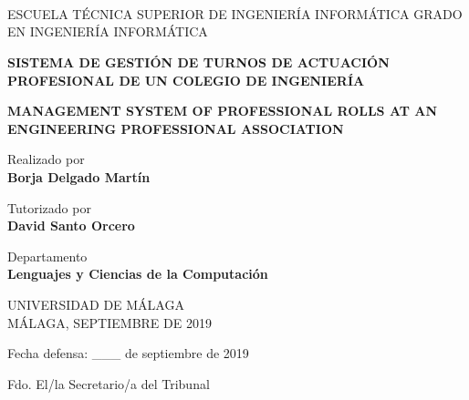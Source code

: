 \thispagestyle{empty}\newpage~

\newpage~\thispagestyle{empty}

\newpage~\thispagestyle{empty} 
\begin{center}
	{\fontsize{13.9}{14}\selectfont ESCUELA TÉCNICA SUPERIOR DE INGENIERÍA INFORMÁTICA GRADO EN INGENIERÍA INFORMÁTICA} \par \vspace{60pt}

	\textbf{{\fontsize{18}{18}\selectfont SISTEMA DE GESTIÓN DE TURNOS DE ACTUACIÓN PROFESIONAL DE UN COLEGIO DE INGENIERÍA}} \par \vspace{20pt}
	\textbf{{\fontsize{18}{18}\selectfont MANAGEMENT SYSTEM OF PROFESSIONAL ROLLS AT AN ENGINEERING PROFESSIONAL ASSOCIATION}} \par \vspace{60pt}

	{\fontsize{14}{14}\selectfont Realizado por} \\
	\textbf{{\fontsize{14}{14}\selectfont Borja Delgado Martín}} \par \vspace{20pt}
	{\fontsize{14}{14}\selectfont Tutorizado por} \\
	\textbf{{\fontsize{14}{14}\selectfont David Santo Orcero}} \par \vspace{20pt}
	{\fontsize{14}{14}\selectfont Departamento} \\
	\textbf{{\fontsize{14}{14}\selectfont Lenguajes y Ciencias de la Computación}} \par \vspace{20pt}

	{\fontsize{13}{13}\selectfont UNIVERSIDAD DE MÁLAGA} \\
	{\fontsize{13}{13}\selectfont MÁLAGA, SEPTIEMBRE DE 2019} \par \vspace{20pt}
\end{center}

\begin{flushright}
	{\fontsize{13}{13}\selectfont Fecha defensa: \_\_\_ de septiembre de 2019} \par \vspace{20pt}
\end{flushright}

{\fontsize{13}{13}\selectfont Fdo. El/la Secretario/a del Tribunal}


